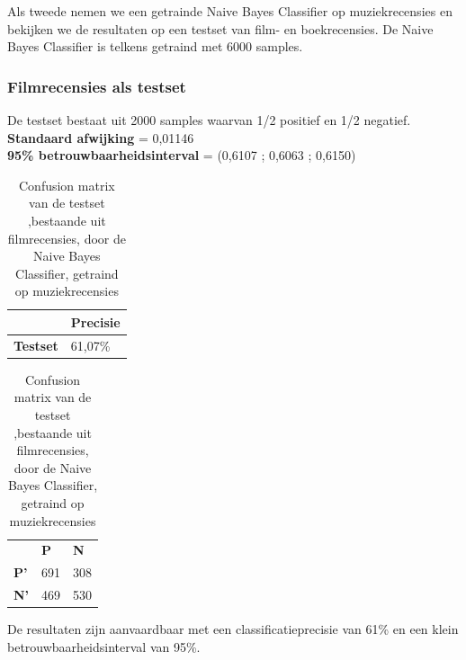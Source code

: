 Als tweede nemen we een getrainde Naive Bayes Classifier op muziekrecensies en bekijken we de resultaten op een testset van film- en boekrecensies. De Naive Bayes Classifier is telkens getraind met 6000 samples.

\subsubsection{Filmrecensies als testset}\label{Filmrecensies als testset}

De testset bestaat uit 2000 samples waarvan 1/2 positief en 1/2 negatief.\\

\textbf{Standaard afwijking} = 0,01146\\
\textbf{95\% betrouwbaarheidsinterval} = (0,6107 ; 0,6063 ; 0,6150)
 
\begin{table}[h]
\centering
\setlength\tabcolsep{4pt}
\begin{minipage}[t]{0.48\textwidth}
\centering
\begin{tabular}{l|l|}
\cline{2-2}
                                            & \textbf{Precisie} \\ \hline
\multicolumn{1}{|l|}{\textbf{Testset}}      & 61,07\%           \\ \hline
\end{tabular}
\caption{Classificatieprecisie Naive Bayes Classifier, getraind op muziekrecensies, getest op filmrecensies}
\end{minipage}%
\hfill
\begin{minipage}[t]{0.48\textwidth}
\centering
\begin{tabular}{lll}
                                 & \textbf{P}               & \textbf{N}               \\ \cline{2-3} 
\multicolumn{1}{l|}{\textbf{P'}} & \multicolumn{1}{l|}{691} & \multicolumn{1}{l|}{308} \\ \cline{2-3} 
\multicolumn{1}{l|}{\textbf{N'}} & \multicolumn{1}{l|}{469} & \multicolumn{1}{l|}{530} \\ \cline{2-3} 
\end{tabular}
\caption{Confusion matrix van de testset ,bestaande uit filmrecensies, door de  Naive Bayes Classifier, getraind op muziekrecensies} 
\end{minipage}
\end{table}

De resultaten zijn aanvaardbaar met een classificatieprecisie van 61\% en een klein betrouwbaarheidsinterval van 95\%.

